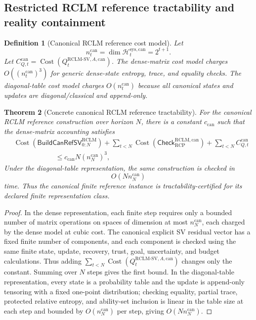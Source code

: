 \documentclass[11pt,a4paper]{article}
\newtheorem{theorem}{Theorem}[section]
\newtheorem{definition}[theorem]{Definition}
\newcommand{\Hcal}{\mathcal H}
\newcommand{\RCP}{\mathrm{RCP}}
\newcommand{\RCLM}{\mathrm{RCLM}}
\newcommand{\sys}{\mathrm{sys}}
\newcommand{\Cost}{\operatorname{Cost}}
\begin{document}
\subsection{Restricted RCLM reference tractability and reality containment}

\begin{definition}[Canonical RCLM reference cost model]
\label{def:rclm-batch13r-canonical-cost-model}
Let
\[
n_t^{\mathrm{can}}=\dim\Hcal_t^{\sys,\mathrm{can}}=2^{t+1}.
\]
Let \(C_{Q,t}^{\mathrm{can}}=\Cost(Q_t^{\RCLM\text{-}\mathrm{SV},A,\mathrm{can}})\). The dense-matrix cost model charges \(O((n_t^{\mathrm{can}})^3)\) for generic dense-state entropy, trace, and equality checks.  The diagonal-table cost model charges \(O(n_t^{\mathrm{can}})\) because all canonical states and updates are diagonal/classical and append-only.
\end{definition}

\begin{theorem}[Concrete canonical RCLM reference tractability]
\label{thm:rclm-batch13r-canonical-tractability}
For the canonical RCLM reference construction over horizon \(N\), there is a constant \(c_{\mathrm{can}}\) such that the dense-matrix accounting satisfies
\[
\begin{aligned}
&\Cost(\mathsf{BuildCanRefSV}_{0:N}^{\RCLM})
+\sum_{t<N}\Cost(\mathsf{Check}_{\RCP}^{\RCLM,\mathrm{can}})
+\sum_{t<N}C_{Q,t}^{\mathrm{can}}\\
&\hspace{6em}\le
c_{\mathrm{can}}N(n_N^{\mathrm{can}})^3,
\end{aligned}
\]
Under the diagonal-table representation, the same construction is checked in
\[
O(Nn_N^{\mathrm{can}})
\]
time.  Thus the canonical finite reference instance is tractability-certified for its declared finite representation class.
\end{theorem}

\begin{proof}
In the dense representation, each finite step requires only a bounded number of matrix operations on spaces of dimension at most \(n_N^{\mathrm{can}}\), each charged by the dense model at cubic cost.  The canonical explicit SV residual vector has a fixed finite number of components, and each component is checked using the same finite state, update, recovery, trust, goal, uncertainty, and budget calculations.  Thus adding \(\sum_{t<N}\Cost(Q_t^{\RCLM\text{-}\mathrm{SV},A,\mathrm{can}})\) changes only the constant.  Summing over \(N\) steps gives the first bound.  In the diagonal-table representation, every state is a probability table and the update is append-only tensoring with a fixed one-point distribution; checking equality, partial trace, protected relative entropy, and ability-set inclusion is linear in the table size at each step and bounded by \(O(n_N^{\mathrm{can}})\) per step, giving \(O(Nn_N^{\mathrm{can}})\).
\end{proof}
\end{document}
